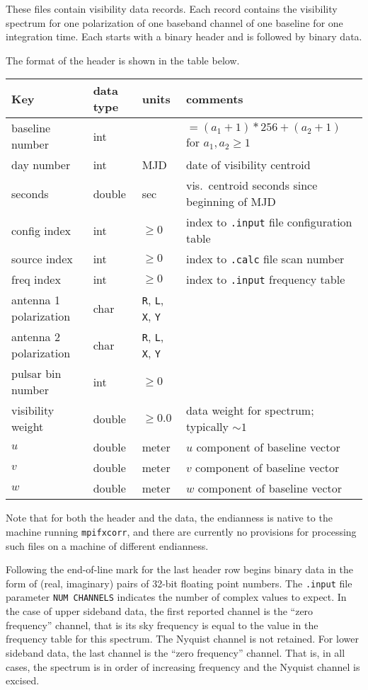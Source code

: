 These files contain visibility data records.
Each record contains the visibility spectrum for one polarization of one baseband channel of one baseline for one integration time.  
Each starts with a binary header and is followed by binary data.

The format of the header is shown in the table below.

\begin{center}
\begin{tabular}{llll}
\hline
Key & data type & units & comments \\
\hline
baseline number		& int	&	& $= (a_1+1)*256 + (a_2+1)$ for $a_1, a_2 \ge 1$ \\
day number		& int	& MJD	& date of visibility centroid \\
seconds			& double& sec	& vis.\ centroid seconds since beginning of MJD \\
config index		& int	&$\ge 0$& index to {\tt .input} file configuration table \\
source index		& int	&$\ge 0$& index to {\tt .calc} file scan number \\
freq index		& int	&$\ge 0$& index to {\tt .input} frequency table \\
antenna 1 polarization	& char  & {\tt R}, {\tt L}, {\tt X}, {\tt Y} & \\
antenna 2 polarization	& char  & {\tt R}, {\tt L}, {\tt X}, {\tt Y} & \\
pulsar bin number	& int	&$\ge 0$& \\
visibility weight	& double& $\ge 0.0$ & data weight for spectrum; typically $\sim 1$ \\
$u$			& double& meter & $u$ component of baseline vector \\
$v$			& double& meter & $v$ component of baseline vector \\
$w$			& double& meter & $w$ component of baseline vector \\
\hline
\hline
\end{tabular}
\end{center}


Note that for both the header and the data, the endianness is native to the machine running {\tt mpifxcorr}, and there are currently no provisions for processing such files on a machine of different endianness.

Following the end-of-line mark for the last header row begins binary data in the form of (real, imaginary) pairs of 32-bit floating point numbers.
The {\tt .input} file parameter {\tt NUM CHANNELS} indicates the number of
complex values to expect.  
In the case of upper sideband data, the first reported channel is the ``zero frequency'' channel, that is its sky frequency is equal to the value in the frequency table for this spectrum.  
The Nyquist channel is not retained.
For lower sideband data, the last channel is the ``zero frequency'' channel.
That is, in all cases, the spectrum is in order of increasing frequency and the Nyquist channel is excised.


